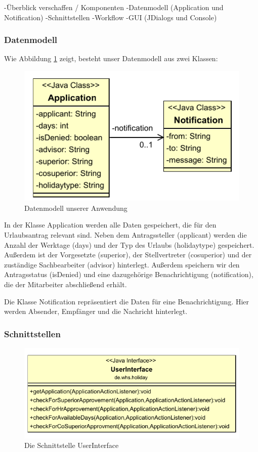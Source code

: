 	-Überblick verschaffen / Komponenten
		-Datenmodell (Application und Notification)
		-Schnittstellen
		-Workflow
		-GUI (JDialogs und Console)

\subsubsection{Datenmodell}
Wie Abbildung \ref{fig:Datenmodell} zeigt, besteht unser Datenmodell aus zwei Klassen:

\begin{figure}[H]
\centering
\includegraphics[width=0.5\linewidth]{Bilder/Datenmodell}
\caption{Datenmodell unserer Anwendung}
\label{fig:Datenmodell}
\end{figure}

In der Klasse Application werden alle Daten gespeichert, die für den Urlaubsantrag relevant sind. Neben dem Antragssteller (applicant) werden die Anzahl der Werktage (days) und der Typ des Urlaubs (holidaytype) gespeichert. Außerdem ist der Vorgesetzte (superior), der Stellvertreter (cosuperior) und der zuständige Sachbearbeiter (advisor) hinterlegt. Außerdem speichern wir den Antragsstatus (isDenied) und eine dazugehörige Benachrichtigung (notification), die der Mitarbeiter abschließend erhält.

Die Klasse Notification repräsentiert die Daten für eine Benachrichtigung. Hier werden Absender, Empfänger und die Nachricht hinterlegt. 

\subsubsection{Schnittstellen}

\begin{figure}[H]
\centering
\includegraphics[width=0.7\linewidth]{Bilder/SchnittstelleUserInterface}
\caption{Die Schnittstelle UserInterface}
\label{fig:SchnittstelleUserInterface}
\end{figure}

